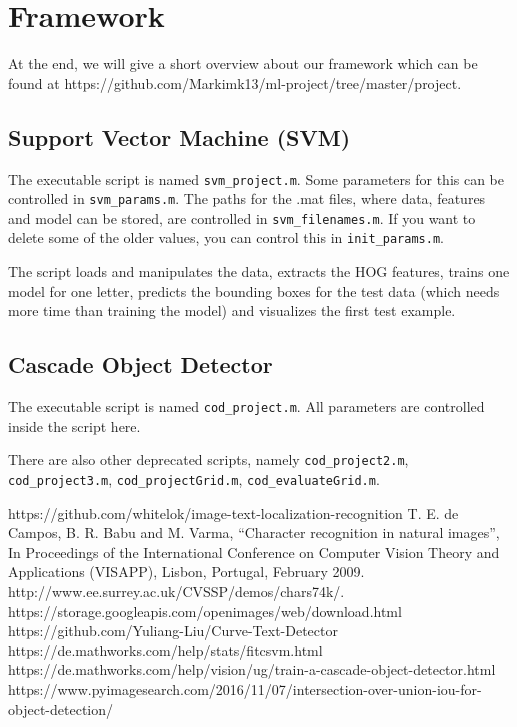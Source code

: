 \documentclass[conference]{IEEEtran}
\begin{document}
\section{Framework}

At the end, we will give a short overview about our framework which can be found at https://github.com/Markimk13/ml-project/tree/master/project.

\subsection{Support Vector Machine (SVM)}

The executable script is named \texttt{svm\_project.m}. Some parameters for this can be controlled in \texttt{svm\_params.m}. The paths for the .mat files, where data, features and model can be stored, are controlled in \texttt{svm\_filenames.m}. If you want to delete some of the older values, you can control this in \texttt{init\_params.m}.

The script loads and manipulates the data, extracts the HOG features, trains one model for one letter, predicts the bounding boxes for the test data (which needs more time than training the model) and visualizes the first test example.

\subsection{Cascade Object Detector}

The executable script is named \texttt{cod\_project.m}. All parameters are controlled inside the script here.

There are also other deprecated scripts, namely \texttt{cod\_project2.m}, \texttt{cod\_project3.m}, \texttt{cod\_projectGrid.m}, \texttt{cod\_evaluateGrid.m}.

\begin{thebibliography}{00}
 https://github.com/whitelok/image-text-localization-recognition
 T. E. de Campos, B. R. Babu and M. Varma, ``Character recognition in natural images'', In Proceedings of the International Conference on Computer Vision Theory and Applications (VISAPP), Lisbon, Portugal, February 2009. http://www.ee.surrey.ac.uk/CVSSP/demos/chars74k/.
 https://storage.googleapis.com/openimages/web/download.html
 https://github.com/Yuliang-Liu/Curve-Text-Detector
 https://de.mathworks.com/help/stats/fitcsvm.html
 https://de.mathworks.com/help/vision/ug/train-a-cascade-object-detector.html
 https://www.pyimagesearch.com/2016/11/07/intersection-over-union-iou-for-object-detection/
\end{thebibliography}
\end{document}
